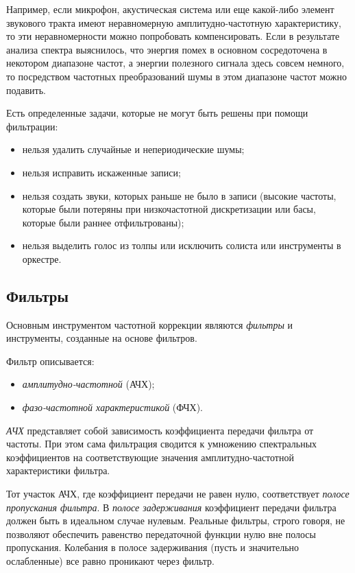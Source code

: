 \documentclass[oneside, final, 14pt]{extreport}
\begin{document}
Например, если микрофон, акустическая система или еще какой-либо элемент звукового тракта имеют неравномерную амплитудно-частотную характеристику, то эти неравномерности можно попробовать компенсировать. Если в результате анализа спектра выяснилось, что энергия помех в основном сосредоточена в некотором диапазоне частот, а энергии полезного сигнала здесь совсем немного, то посредством частотных преобразований шумы в этом диапазоне частот можно подавить.

Есть определенные задачи, которые не могут быть решены при помощи фильтрации:
\begin{itemize}
  \item нельзя удалить случайные и непериодические шумы;
  \item нельзя исправить искаженные записи;
  \item нельзя создать звуки, которых раньше не было в записи (высокие частоты, которые были потеряны при низкочастотной дискретизации или басы, которые были раннее отфильтрованы);
  \item нельзя выделить голос из толпы или исключить солиста или инструменты в оркестре.
\end{itemize}

\subsection{Фильтры}
Основным инструментом частотной коррекции являются \emph{фильтры} и инструменты, созданные на основе фильтров.

Фильтр описывается:
\begin{itemize}
  \item \emph{амплитудно-частотной} (АЧХ);
  \item \emph{фазо-частотной характеристикой} (ФЧХ).
\end{itemize}

\emph{АЧХ} представляет собой зависимость коэффициента передачи фильтра от частоты. При этом сама фильтрация сводится к умножению спектральных коэффициентов на соответствующие значения амплитудно-частотной характеристики фильтра.

Тот участок АЧХ, где коэффициент передачи не равен нулю, соответствует \emph{полосе пропускания фильтра}. В \emph{полосе задерживания} коэффициент передачи фильтра должен быть в идеальном случае нулевым. Реальные фильтры, строго говоря, не позволяют обеспечить равенство передаточной функции нулю вне полосы пропускания. Колебания в полосе задерживания (пусть и значительно ослабленные) все равно проникают через фильтр.
\end{document}
